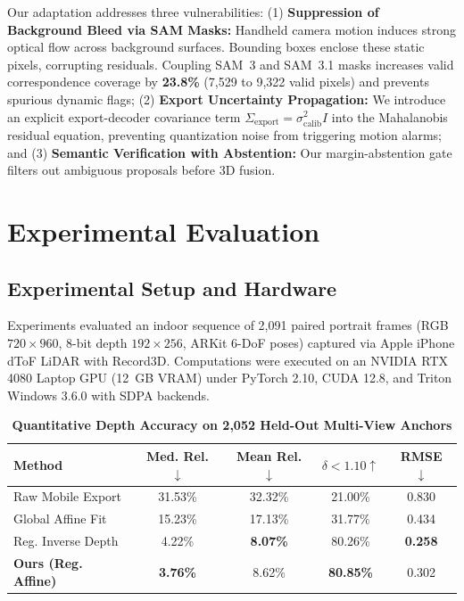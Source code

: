 \documentclass[conference]{IEEEtran}
\begin{document}
Our adaptation addresses three vulnerabilities: (1) \textbf{Suppression of Background Bleed via SAM Masks:} Handheld camera motion induces strong optical flow across background surfaces. Bounding boxes enclose these static pixels, corrupting residuals. Coupling SAM~3 and SAM~3.1 masks increases valid correspondence coverage by \textbf{23.8\%} (7,529 to 9,322 valid pixels) and prevents spurious dynamic flags; (2) \textbf{Export Uncertainty Propagation:} We introduce an explicit export-decoder covariance term $\Sigma_{\mathrm{export}} = \sigma_{\mathrm{calib}}^2 I$ into the Mahalanobis residual equation, preventing quantization noise from triggering motion alarms; and (3) \textbf{Semantic Verification with Abstention:} Our margin-abstention gate filters out ambiguous proposals before 3D fusion.

\section{Experimental Evaluation}

\subsection{Experimental Setup and Hardware}
Experiments evaluated an indoor sequence of 2,091 paired portrait frames (RGB $720 \times 960$, 8-bit depth $192 \times 256$, ARKit 6-DoF poses) captured via Apple iPhone dToF LiDAR with Record3D. Computations were executed on an NVIDIA RTX 4080 Laptop GPU (12~GB VRAM) under PyTorch 2.10, CUDA 12.8, and Triton Windows 3.6.0 with SDPA backends.

\begin{table}[t]
\caption{\textbf{Quantitative Depth Accuracy on 2,052 Held-Out Multi-View Anchors}}
\label{tab:depth_accuracy}
\centering
\footnotesize
\setlength{\tabcolsep}{3.2pt}
\begin{tabularx}{\columnwidth}{@{}lcccc@{}}
\toprule
\textbf{Method} & \textbf{Med. Rel. $\downarrow$} & \textbf{Mean Rel. $\downarrow$} & \textbf{$\delta < 1.10 \uparrow$} & \textbf{RMSE $\downarrow$} \\
\midrule
Raw Mobile Export & 31.53\% & 32.32\% & 21.00\% & 0.830 \\
Global Affine Fit & 15.23\% & 17.13\% & 31.77\% & 0.434 \\
Reg. Inverse Depth & 4.22\% & \textbf{8.07\%} & 80.26\% & \textbf{0.258} \\
\textbf{Ours (Reg. Affine)} & \textbf{3.76\%} & 8.62\% & \textbf{80.85\%} & 0.302 \\
\bottomrule
\end{tabularx}
\end{table}
\end{document}
